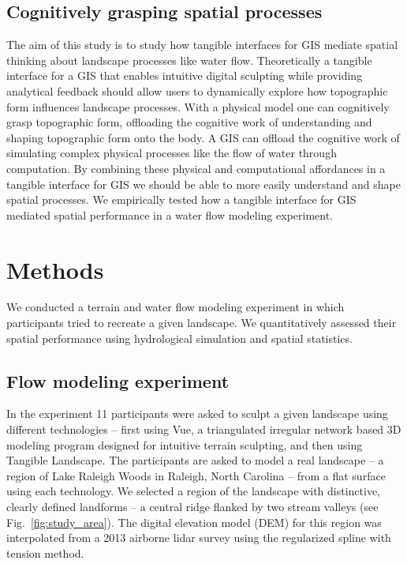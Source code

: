 \documentclass{isprs}
\begin{document}
\subsection{Cognitively grasping spatial processes}
The aim of this study is to study how tangible interfaces for GIS 
mediate spatial thinking about landscape processes like water flow. 
Theoretically a tangible interface for a GIS that enables intuitive digital sculpting while providing analytical %
feedback should allow users to dynamically explore how topographic form influences landscape processes. 
With a physical model one can 
cognitively grasp topographic form, 
offloading the cognitive work of 
understanding and shaping topographic form onto the body. 
A GIS can offload the cognitive work of simulating complex physical processes
like the flow of water through computation. 
By combining these physical and computational affordances in a tangible interface for GIS we should be able to more easily understand and shape spatial processes. 
We empirically tested how a tangible interface for GIS 
mediated spatial performance in a water flow modeling experiment. 


\section{Methods}\label{sec:methods}
%
We conducted a terrain and water flow modeling experiment 
in which participants tried to recreate a given landscape. 
%
We quantitatively assessed their spatial performance using hydrological simulation and spatial statistics.


\subsection{Flow modeling experiment}
%
In the experiment 11 participants were asked to sculpt a given landscape using different technologies -- 
first using Vue, a triangulated irregular network based 3D modeling program designed for intuitive terrain sculpting, 
and then using Tangible Landscape. 
%
The participants are asked to model a real landscape --
a region of Lake Raleigh Woods 
in Raleigh, North Carolina  -- 
from a flat surface using each technology. 
We selected a region of the landscape with distinctive, 
clearly defined landforms -- a central ridge flanked by two stream valleys 
(see Fig.~\ref{fig:study_area}). 
The digital elevation model (DEM) for this region was interpolated from a 2013 airborne lidar survey using the regularized spline with tension method.
\end{document}
